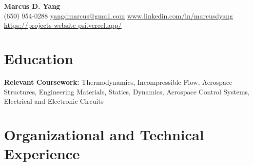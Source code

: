 \newcommand{\entrygap}{\vspace{2pt}}



\begin{center}
  {\fontsize{17}{20}\selectfont\bfseries Marcus D. Yang}\\[2pt]
  {\footnotesize (650) 954-0288 \textbar{} \href{mailto:yangdmarcus@gmail.com}{yangdmarcus@gmail.com} \textbar{} \href{https://www.linkedin.com/in/marcusdyang}{www.linkedin.com/in/marcusdyang} \textbar{} \href{https://projects-website-psi.vercel.app/}{https://projects-website-psi.vercel.app/}}
\end{center}

\section{Education}
\textbf{Relevant Coursework:} Thermodynamics, Incompressible Flow, Aerospace Structures, Engineering Materials, Statics, Dynamics, Aerospace Control Systems, Electrical and Electronic Circuits

\section{Organizational and Technical Experience}

